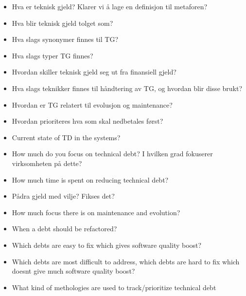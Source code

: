 \begin{itemize}
	\item Hva er teknisk gjeld? Klarer vi å lage en definisjon til metaforen?
	\item Hva blir teknisk gjeld tolget som?
	\item Hva slags synonymer finnes til TG?
	\item Hva slags typer TG finnes? 
	\item Hvordan skiller teknisk gjeld seg ut fra finansiell gjeld?

	\item Hva slags teknikker finnes til håndtering av TG, og hvordan blir disse brukt?
	\item Hvordan er TG relatert til evolusjon og maintenance?

	\item Hvordan prioriteres hva som skal nedbetales først?




	\item Current state of TD in the systems?
	\item How much do you focus on technical debt? I hvilken grad fokuserer virksomheten på dette?
	\item How much time is spent on reducing technical debt?
	\item Pådra gjeld med vilje? Fikses det?
	\item How much focus there is on maintenance and evolution?
	\item When a debt should be refactored?
	\item Which debts are easy to fix which gives software quality boost?
	\item Which debts are most difficult to address, which debts are hard to fix which doesnt give much software quality boost?
	\item What kind of methologies are used to track/prioritize technical debt
\end{itemize}